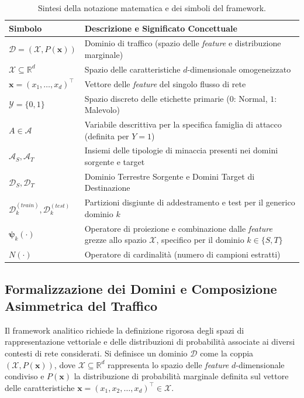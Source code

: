 \begin{table}[H]
    \centering
    \caption{Sintesi della notazione matematica e dei simboli del framework.}
    \label{tab:notazione_matematica}
    \begin{tabularx}{\textwidth}{>{\raggedright\arraybackslash}p{3cm} >{\raggedright\arraybackslash}X }
    \toprule
    \textbf{Simbolo} & \textbf{Descrizione e Significato Concettuale} \\
    \midrule
    $\mathcal{D} = (\mathcal{X}, P(\mathbf{x}))$ &
    Dominio di traffico (spazio delle \textit{feature} e distribuzione marginale) \\
    $\mathcal{X} \subseteq \mathbb{R}^d$ &
    Spazio delle caratteristiche $d$-dimensionale omogeneizzato \\
    $\mathbf{x} = (x_1, \dots, x_d)^\top$ &
    Vettore delle \textit{feature} del singolo flusso di rete \\
    $\mathcal{Y} = \{0,1\}$ &
    Spazio discreto delle etichette primarie ($0$: Normal, $1$: Malevolo) \\
    $A \in \mathcal{A}$ &
    Variabile descrittiva per la specifica famiglia di attacco (definita per $Y=1$) \\
    $\mathcal{A}_S, \mathcal{A}_T$ &
    Insiemi delle tipologie di minaccia presenti nei domini sorgente e target \\
    $\mathcal{D}_S, \mathcal{D}_T$ &
    Dominio Terrestre Sorgente e Domini Target di Destinazione \\
    $\mathcal{D}_k^{(train)}, \mathcal{D}_k^{(test)}$ &
    Partizioni disgiunte di addestramento e test per il generico dominio $k$ \\
    $\boldsymbol{\psi}_k(\cdot)$ &
    Operatore di proiezione e combinazione dalle \textit{feature} grezze allo spazio $\mathcal{X}$, specifico per il dominio $k \in \{S,T\}$ \\
    $N(\cdot)$ &
    Operatore di cardinalità (numero di campioni estratti) \\
    \bottomrule
    \end{tabularx}
\end{table}

\subsection{Formalizzazione dei Domini e Composizione Asimmetrica del Traffico}
\label{subsec:composizione_domini}

Il framework analitico richiede la definizione rigorosa degli spazi di rappresentazione vettoriale e delle distribuzioni di probabilità associate ai diversi contesti di rete considerati. Si definisce un dominio $\mathcal{D}$ come la coppia $(\mathcal{X}, P(\mathbf{x}))$, dove $\mathcal{X} \subseteq \mathbb{R}^d$ rappresenta lo spazio delle \textit{feature} $d$-dimensionale condiviso e $P(\mathbf{x})$ la distribuzione di probabilità marginale definita sul vettore delle caratteristiche $\mathbf{x} = (x_1, x_2, \dots, x_d)^\top \in \mathcal{X}$.

